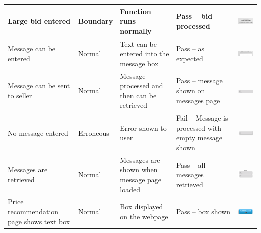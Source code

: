 \begin{center}
\begin{longtable}{|P{23mm}|P{20mm}|P{19mm}|P{20mm}|P{54mm}|}
Large bid entered & Boundary & Function runs normally & Pass -- bid
processed &
\includegraphics[width=51mm]{ch4_testing_for_eval/media/image36.png} \\ \hline
Message can be entered & Normal & Text can be entered into the message
box & Pass -- as expected &
\includegraphics[width=51mm]{ch4_testing_for_eval/media/image37.png} \\ \hline
Message can be sent to seller & Normal & Message processed and then can
be retrieved & Pass -- message shown on messages page &
\includegraphics[width=51mm]{ch4_testing_for_eval/media/image38.png} \\ \hline
No message entered & Erroneous & Error shown to user & Fail -- Message
is processed with empty message shown &
\includegraphics[width=51mm]{ch4_testing_for_eval/media/image39.png} \\ \hline
Messages are retrieved & Normal & Messages are shown when message page
loaded & Pass -- all messages retrieved &
\includegraphics[width=51mm]{ch4_testing_for_eval/media/image40.png} \\ \hline
Price recommendation page shows text box & Normal & Box displayed on the
webpage & Pass -- box shown &
\includegraphics[width=51mm]{ch4_testing_for_eval/media/image41.png} \\ \hline

\end{longtable}
\end{center}
